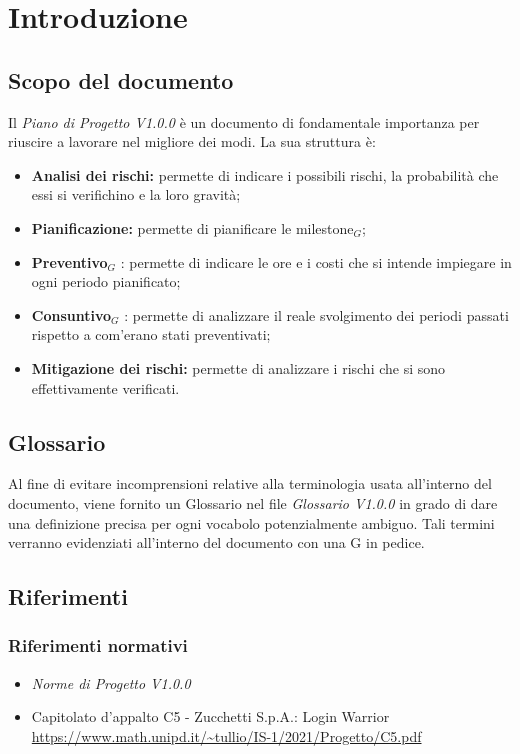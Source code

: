 \chapter{Introduzione}

\section{Scopo del documento}

Il \textit{Piano di Progetto V1.0.0} è un documento di fondamentale importanza per riuscire a lavorare nel migliore dei
modi. La sua struttura è:
\begin{itemize}
    \item \textbf{Analisi dei rischi: } permette di indicare i possibili rischi, la probabilità che essi si verifichino e la loro gravità;
    \item \textbf{Pianificazione: } permette di pianificare le milestone$_G$;
    \item \textbf{Preventivo}$_G$ : permette di indicare le ore e i costi che si intende impiegare in ogni periodo pianificato;
    \item \textbf{Consuntivo}$_G$ : permette di analizzare il reale svolgimento dei periodi passati rispetto a com'erano stati preventivati;
    \item \textbf{Mitigazione dei rischi: } permette di analizzare i rischi che si sono effettivamente verificati.
\end{itemize}

\section{Glossario}
Al fine di evitare incomprensioni relative alla terminologia usata all'interno del documento, viene fornito un Glossario nel file \textit{Glossario V1.0.0} in grado di dare una definizione precisa per ogni vocabolo potenzialmente ambiguo. Tali termini verranno evidenziati all'interno del documento con una G in pedice.

\section{Riferimenti}
\subsection{Riferimenti normativi}
\begin{itemize}
  \item \textit{Norme di Progetto V1.0.0}
  \item Capitolato d'appalto C5 - Zucchetti S.p.A.: Login Warrior \\
  \url{https://www.math.unipd.it/~tullio/IS-1/2021/Progetto/C5.pdf}
\end{itemize}

